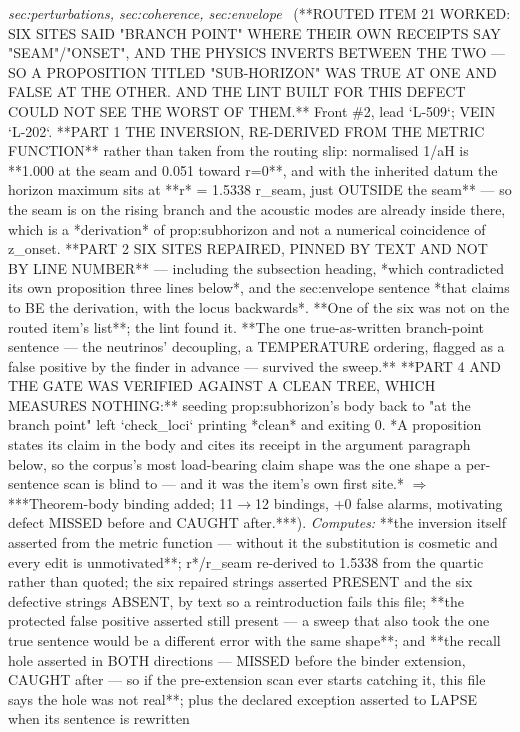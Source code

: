 \begin{description}
\textit{sec:perturbations, sec:coherence, sec:envelope} \ (**ROUTED ITEM 21 WORKED: SIX SITES SAID "BRANCH POINT" WHERE THEIR OWN RECEIPTS SAY "SEAM"/"ONSET", AND THE PHYSICS INVERTS BETWEEN THE TWO --- SO A PROPOSITION TITLED "SUB-HORIZON" WAS TRUE AT ONE AND FALSE AT THE OTHER. AND THE LINT BUILT FOR THIS DEFECT COULD NOT SEE THE WORST OF THEM.** Front \#2, lead `L-509`; VEIN `L-202`. **PART 1 THE INVERSION, RE-DERIVED FROM THE METRIC FUNCTION** rather than taken from the routing slip: normalised 1/aH is **1.000 at the seam and 0.051 toward r=0**, and with the inherited datum the horizon maximum sits at **r* = 1.5338 r\_seam, just OUTSIDE the seam** --- so the seam is on the rising branch and the acoustic modes are already inside there, which is a *derivation* of prop:subhorizon and not a numerical coincidence of z\_onset. **PART 2 SIX SITES REPAIRED, PINNED BY TEXT AND NOT BY LINE NUMBER** --- including the subsection heading, *which contradicted its own proposition three lines below*, and the sec:envelope sentence *that claims to BE the derivation, with the locus backwards*. **One of the six was not on the routed item's list**; the lint found it. **The one true-as-written branch-point sentence --- the neutrinos' decoupling, a TEMPERATURE ordering, flagged as a false positive by the finder in advance --- survived the sweep.** **PART 4 AND THE GATE WAS VERIFIED AGAINST A CLEAN TREE, WHICH MEASURES NOTHING:** seeding prop:subhorizon's body back to "at the branch point" left `check\_loci` printing *clean* and exiting 0. *A proposition states its claim in the body and cites its receipt in the argument paragraph below, so the corpus's most load-bearing claim shape was the one shape a per-sentence scan is blind to --- and it was the item's own first site.* \ensuremath{\Rightarrow} ***Theorem-body binding added; 11\ensuremath{\to}12 bindings, +0 false alarms, motivating defect MISSED before and CAUGHT after.***). 
\emph{Computes:} **the inversion itself asserted from the metric function --- without it the substitution is cosmetic and every edit is unmotivated**; r*/r\_seam re-derived to 1.5338 from the quartic rather than quoted; the six repaired strings asserted PRESENT and the six defective strings ABSENT, by text so a reintroduction fails this file; **the protected false positive asserted still present --- a sweep that also took the one true sentence would be a different error with the same shape**; and **the recall hole asserted in BOTH directions --- MISSED before the binder extension, CAUGHT after --- so if the pre-extension scan ever starts catching it, this file says the hole was not real**; plus the declared exception asserted to LAPSE when its sentence is rewritten

\end{description}
